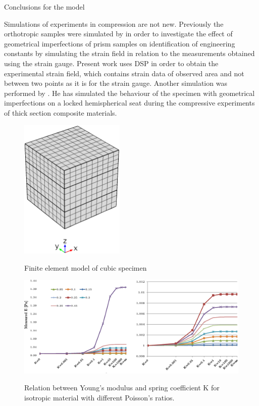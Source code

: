 \documentclass[review]{elsarticle}
\begin{document}
\begin{description}
\item[{\color {red}Conclusions for the model}]
\end{description}

Simulations of experiments in compression are not new. Previously the
orthotropic samples were simulated by \cite{Toftegaard1999849} in order to investigate the effect of
geometrical imperfections of prism samples on identification of engineering
constants by simulating the strain field in relation to the measurements
obtained using the strain gauge. 
Present work uses DSP in order to obtain the experimental strain field, which
contains strain data of observed area and not between two points as it is for the strain gauge. 
Another simulation was performed by \cite{Chen001}.
He has simulated the behaviour of the specimen with geometrical
imperfections on a locked hemispherical seat during the compressive experiments
of thick section composite materials.





\begin{figure}[h]
\centering
\includegraphics[width=5cm]{CubeFEM.eps}
\label{fig:cubemesh}
\caption{\label{fig:cubemesh} Finite element model of cubic specimen}
\end{figure}

\begin{figure}[h]
\centering
\includegraphics[width=12cm]{KIsotropBoth.eps}
\label{fig:cubemesh}
\caption{\label{fig:KIsotropic} Relation between Young's modulus and spring
coefficient K for isotropic material with different Poisson's ratios.}
\end{figure}
\end{document}
